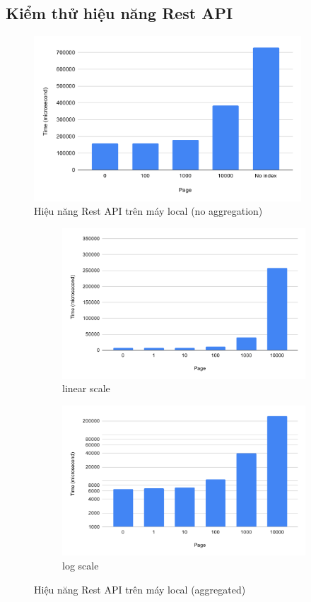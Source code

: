 \subsection{Kiểm thử hiệu năng Rest API}
\begin{figure}[H]
\centering
\includegraphics[width=10cm]{images/testing/view-local.png}
\caption{Hiệu năng Rest API trên máy local (no aggregation)}
\end{figure}

\begin{figure}[H]
\centering
\begin{subfigure}{0.5\textwidth}
    \centering
    \includegraphics[width=\textwidth]
    {images/testing/view-aggregated-local.png}
    \caption{linear scale}
\end{subfigure}%
\begin{subfigure}{0.5\textwidth}
    \centering
    \includegraphics[width=\textwidth]
    {images/testing/view-aggregated-local-log.png}
    \caption{log scale}
\end{subfigure}
\caption{Hiệu năng Rest API trên máy local (aggregated)}
\end{figure}

